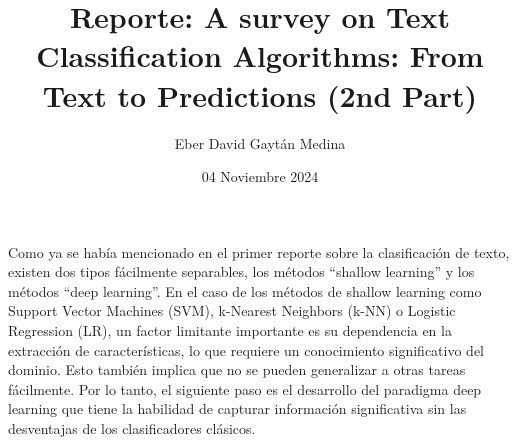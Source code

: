 \documentclass[letterpaper,12pt]{article}
\title{Reporte: A survey on Text Classification Algorithms: From Text to Predictions (2nd Part)}
\author{Eber David Gaytán Medina}
\date{04 Noviembre 2024}
\begin{document}
\maketitle

Como ya se había mencionado en el primer reporte sobre la clasificaci\'on de 
texto, existen dos tipos fácilmente separables, los métodos ``shallow learning''
y los métodos ``deep learning''. En el caso de los métodos de shallow learning como 
Support Vector Machines (SVM), k-Nearest Neighbors (k-NN) o Logistic Regression (LR), 
un factor limitante importante es su dependencia en la extracción de características, 
lo que requiere un conocimiento significativo del dominio. Esto también implica que 
no se pueden generalizar a otras tareas fácilmente. 
Por lo tanto, el siguiente paso es el desarrollo del paradigma deep learning
que tiene la habilidad de capturar informaci\'on significativa sin las desventajas
de los clasificadores cl\'asicos.
\end{document}
